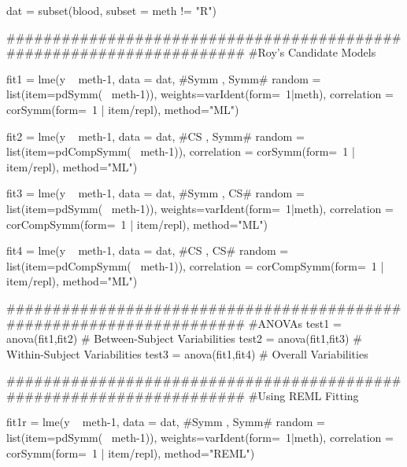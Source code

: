 dat = subset(blood, subset = meth != "R")

#####################################################################
#Roy's Candidate Models

    
fit1 = lme(y ~ meth-1, data = dat,   #Symm , Symm#
    random = list(item=pdSymm(~ meth-1)), 
    weights=varIdent(form=~1|meth),
    correlation = corSymm(form=~1 | item/repl), 
    method="ML")
    
fit2 = lme(y ~ meth-1, data = dat,   #CS , Symm#
    random = list(item=pdCompSymm(~ meth-1)),
    correlation = corSymm(form=~1 | item/repl), 
    method="ML")
    
fit3 = lme(y ~ meth-1, data = dat,   #Symm , CS# 
    random = list(item=pdSymm(~ meth-1)),
    weights=varIdent(form=~1|meth), 
    correlation = corCompSymm(form=~1 | item/repl), 
    method="ML")
    
fit4 = lme(y ~ meth-1, data = dat,   #CS , CS# 
    random = list(item=pdCompSymm(~ meth-1)), 
    correlation = corCompSymm(form=~1 | item/repl), 
    method="ML")
    
#####################################################################
#ANOVAs
test1 = anova(fit1,fit2) # Between-Subject Variabilities
test2 = anova(fit1,fit3) # Within-Subject Variabilities
test3 = anova(fit1,fit4) # Overall Variabilities


#####################################################################
#Using REML Fitting


fit1r = lme(y ~ meth-1, data = dat,   #Symm , Symm#
    random = list(item=pdSymm(~ meth-1)), 
    weights=varIdent(form=~1|meth),
    correlation = corSymm(form=~1 | item/repl), 
    method="REML")
    
 
